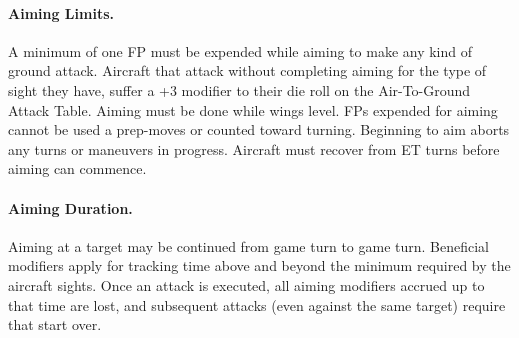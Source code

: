 
\paragraph{Aiming Limits.} A minimum of one FP must be expended while aiming to make any kind of ground attack. Aircraft that attack without completing aiming for the type of sight they have, suffer a +3 modifier to their die roll on the Air-To-Ground Attack Table. Aiming must be done while wings level. FPs expended for aiming cannot be used a prep-moves or counted toward turning. Beginning to aim aborts any turns or maneuvers in progress.  Aircraft must recover from ET turns before aiming can commence.

\paragraph{Aiming Duration.} Aiming at a target may be continued from game turn to game turn. Beneficial modifiers apply for tracking time above and beyond the minimum required by the aircraft sights. Once an attack is executed, all aiming modifiers accrued up to that time are lost, and subsequent attacks (even against the same target) require that start over. 


